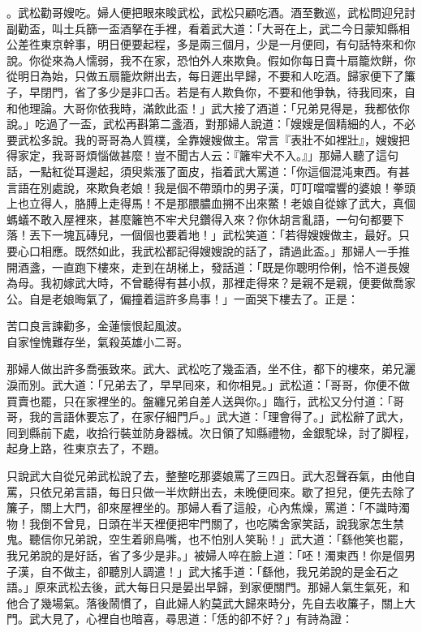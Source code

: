 。武松勸哥嫂吃。婦人便把眼來睃武松，武松只顧吃酒。酒至數巡，武松問迎兒討副勸盃，叫土兵篩一盃酒拏在手裡，看着武大道：「大哥在上，武二今日蒙知縣相公差徃東京幹事，明日便要起程，多是兩三個月，少是一月便囘，有句話特來和你說。你從來為人懦弱，我不在家，恐怕外人來欺負。假如你每日賣十扇籠炊餅，你從明日為始，只做五扇籠炊餅出去，每日遲出早歸，不要和人吃酒。歸家便下了簾子，早閉門，省了多少是非口舌。若是有人欺負你，不要和他爭執，待我囘來，自和他理論。大哥你依我時，滿飲此盃！」武大接了酒道：「兄弟見得是，我都依你說。」吃過了一盃，武松再斟第二盞酒，對那婦人說道：「嫂嫂是個精細的人，不必要武松多說。我的哥哥為人質樸，全靠嫂嫂做主。常言『表壯不如裡壯』，嫂嫂把得家定，我哥哥煩惱做甚麼！豈不聞古人云：『籬牢犬不入。』」{}那婦人聽了這句話，一點紅從耳邊起，須臾紫漲了面皮，指着武大罵道：「你這個混沌東西。有甚言語在別處說，來欺負老娘！我是個不帶頭巾的男子漢，叮叮噹噹響的婆娘！拳頭上也立得人，胳膊上走得馬！不是那腲膿血搠不出來鱉！老娘自從嫁了武大，真個螞蟻不敢入屋裡來，甚麼籬笆不牢犬兒鑽得入來？你休胡言亂語，一句句都要下落！丟下一塊瓦磚兒，一個個也要着地！」{}武松笑道：「若得嫂嫂做主，最好。只要心口相應。既然如此，我武松都記得嫂嫂說的話了，請過此盃。」那婦人一手推開酒盞，一直跑下樓來，走到在胡梯上，發話道：「既是你聰明伶俐，恰不道長嫂為母。我初嫁武大時，不曾聽得有甚小叔，那裡走得來？是親不是親，便要做喬家公。自是老娘晦氣了，偏撞着這許多鳥事！」{}一面哭下樓去了。正是：

\begin{myquote}
苦口良言諫勸多，金蓮懷恨起風波。\\自家惶愧難存坐，氣殺英雄小二哥。
\end{myquote}

那婦人做出許多喬張致來。武大、武松吃了幾盃酒，坐不住，都下的樓來，弟兄灑淚而別。武大道：「兄弟去了，早早囘來，和你相見。」武松道：「哥哥，你便不做買賣也罷，{}只在家裡坐的。盤纏兄弟自差人送與你。」臨行，武松又分付道：「哥哥，我的言語休要忘了，在家仔細門戶。」武大道：「理會得了。」武松辭了武大，囘到縣前下處，收拾行裝並防身器械。次日領了知縣禮物，金銀駝垛，討了脚程，起身上路，徃東京去了，不題。

只說武大自從兄弟武松說了去，整整吃那婆娘罵了三四日。武大忍聲吞氣，由他自罵，只依兄弟言語，每日只做一半炊餅出去，未晚便囘來。歇了担兒，便先去除了簾子，關上大門，卻來屋裡坐的。那婦人看了這般，心內焦燥，罵道：「不識時濁物！我倒不曾見，日頭在半天裡便把牢門關了，也吃隣舍家笑話，說我家怎生禁鬼。聽信你兄弟說，空生着卵鳥嘴，也不怕別人笑恥！」武大道：「繇他笑也罷，{}我兄弟說的是好話，省了多少是非。」被婦人啐在臉上道：「呸！濁東西！你是個男子漢，自不做主，卻聽別人調遣！」武大搖手道：「繇他，我兄弟說的是金石之語。」原來武松去後，武大每日只是晏出早歸，到家便關門。那婦人氣生氣死，和他合了幾場氣。落後鬧慣了，自此婦人約莫武大歸來時分，先自去收簾子，關上大門。武大見了，心裡自也暗喜，尋思道：「恁的卻不好？」有詩為證：


